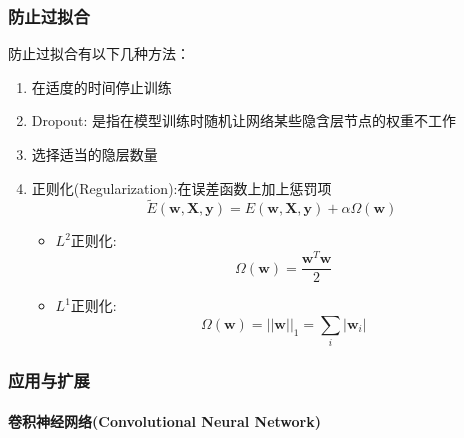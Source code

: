\documentclass[11pt]{article}
\begin{document}
    			\subsubsection{防止过拟合}
    				防止过拟合有以下几种方法：
    				\begin{enumerate}
    					\item 在适度的时间停止训练
    					\item Dropout: 是指在模型训练时随机让网络某些隐含层节点的权重不工作
    					\item 选择适当的隐层数量
    					\item 正则化(Regularization):在误差函数上加上惩罚项
    				\[\tilde{E}(\mathbf{w, X, y}) = E(\mathbf{w, X, y}) + \alpha \Omega(\mathbf{w})\]
    				\begin{itemize}
    					\item $L^2$正则化:\[\Omega(\mathbf{w}) = \frac{\mathbf{w}^T\mathbf{w}}{2}\]
    					\item $L^1$正则化:\[\Omega(\mathbf{w}) = ||\mathbf{w}||_1 = \sum_i |\mathbf{w}_i|\]
    				\end{itemize}
    				\end{enumerate}
		\subsubsection{应用与扩展}
			\paragraph{卷积神经网络(Convolutional Neural Network)}
			
\end{document}
